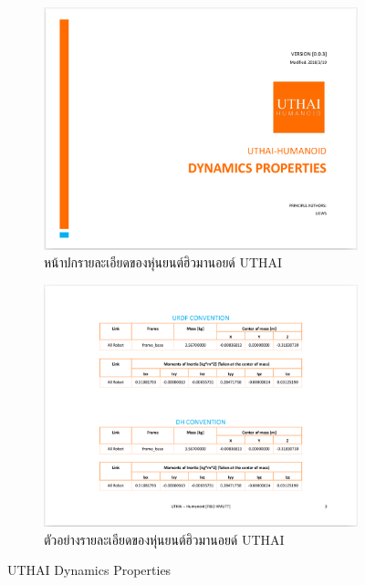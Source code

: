 \begin{figure}[!ht]
    \centering
    \begin{subfigure}[b]{0.45\textwidth}
        \centering
        \includegraphics[width=\textwidth]{chapter4/images/uthai_manual/uthai_dynamics.png}
        \caption{หน้าปกรายละเอียดของหุ่นยนต์ฮิวมานอยด์ UTHAI}
    \end{subfigure}
    \hfill
    \begin{subfigure}[b]{0.45\textwidth}
        \centering
        \includegraphics[width=\textwidth]{chapter4/images/uthai_manual/uthai_dynamics2.png}
        \caption{ตัวอย่างรายละเอียดของหุ่นยนต์ฮิวมานอยด์ UTHAI}
    \end{subfigure}
    \caption{UTHAI Dynamics Properties}
	\label{fig:uthai_dynamics_manual}
\end{figure}


